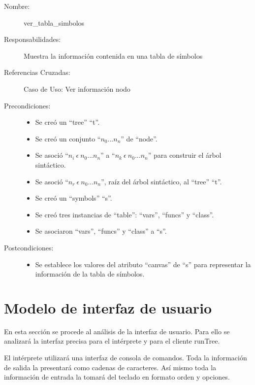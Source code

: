 	\begin{description}
		\item [Nombre:] ver\_tabla\_simbolos
		\item [Responsabilidades:] Muestra la información contenida en una tabla de símbolos
		\item [Referencias Cruzadas: ] Caso de Uso: Ver información nodo
      \item [Precondiciones:] \hfill
         \begin {itemize}
         \item Se creó un ``tree'' ``t''.
         \item Se creó un conjunto ``$n_0...n_n$'' de ``node''.
         \item Se asoció ``$n_i\ \epsilon\ n_0...n_n$'' a ``$n_k\ \epsilon\ n_0...n_n$'' para construir el árbol sintáctico.
         \item Se asoció  ``$n_r\ \epsilon\ n_0...n_n$'', raíz del árbol sintáctico, al ``tree'' ``t''.
         \item Se creó un ``symbols'' ``s''.
         \item Se creó tres instancias de ``table'': ``vars'', ``funcs'' y ``class''.
         \item Se asociaron ``vars'', ``funcs'' y ``class'' a ``s''.
      \end{itemize}
      \item [Postcondiciones:] \hfill
      \begin {itemize}
         \item Se establece los valores del atributo ``canvas'' de ``s'' para representar la información de la tabla de símbolos.
      \end{itemize}
	\end{description} 




\section{Modelo de interfaz de usuario}
En esta sección se procede al análisis de la interfaz de usuario. Para ello se analizará la interfaz precisa 
para el intérprete y para el cliente runTree.

El intérprete utilizará una interfaz de consola de comandos. Toda la información de salida la presentará como 
cadenas de caracteres. Así mismo toda la información de entrada la tomará del teclado en formato orden y opciones. 

